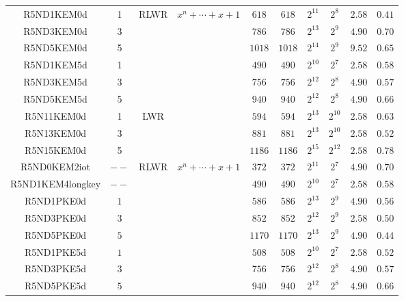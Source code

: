 \documentclass{cta-author}
\begin{document}
\begin{table}[pt]
\begin{tabular}{ c| c| c | c || c | c | c |c||c| c }
		
		R5ND1KEM0d&1&\multirow{6}{*}{RLWR}&\multirow{6}{*}{$x^{n}+\cdots +x+1$}&$618$&$618$&$2^{11}$&$2^8$& $2.58$&$0.41$\\
		R5ND3KEM0d&3&&& $786$&$786$&$2^{13}$&$2^9$& $4.90$&$0.70$\\
		R5ND5KEM0d&5&&& $1018$&$1018$&$2^{14}$&$2^9$& $9.52$&$0.65$\\
		
		
		R5ND1KEM5d&1&&& $490$&$490$&$2^{10}$&$2^7$& $2.58$&$0.58$\\
		
		R5ND3KEM5d&3&&& $756$&$756$&$2^{12}$&$2^8$& $4.90$&$0.57$\\
		
		R5ND5KEM5d&5&&& $940$&$940$&$2^{12}$&$2^8$& $4.90$&$0.66$\\
		\hline
	
		
		R5N11KEM0d&1&\multirow{3}{*}{LWR}&& $594$&$594$&$2^{13}$&$2^{10}$& $2.58$&$0.63$\\
		
		R5N13KEM0d&3&&& $881$&$881$&$2^{13}$&$2^{10}$& $2.58$&$0.52$\\
		
		R5N15KEM0d&5&&& $1186$&$1186$&$2^{15}$&$2^{12}$& $2.58$&$0.78$\\
		
		

		\hline
		R5ND0KEM2iot&$--$&\multirow{8}{*}{RLWR}&\multirow{8}{*}{$x^{n}+\cdots +x+1$}& $372$&$372$&$2^{11}$&$2^{7}$& $4.90$&$0.70$\\
		R5ND1KEM4longkey&$--$&&& $490$&$490$&$2^{10}$&$2^{7}$& $2.58$&$0.58$\\
		
		R5ND1PKE0d&$1$&&& $586$&$586$&$2^{13}$&$2^{9}$& $4.90$&$0.56$\\
		
	
		R5ND3PKE0d&$3$&&& $852$&$852$&$2^{12}$&$2^{9}$& $2.58$&$0.50$\\
		
		R5ND5PKE0d&$5$&&& $1170$&$1170$&$2^{13}$&$2^{9}$& $4.90$&$0.44$\\
		
		R5ND1PKE5d&$1$&&& $508$&$508$&$2^{10}$&$2^{7}$& $2.58$&$0.52$\\
		
		
		R5ND3PKE5d&$3$&&& $756$&$756$&$2^{12}$&$2^{8}$& $4.90$&$0.57$\\
		
		R5ND5PKE5d&$5$&&& $940$&$940$&$2^{12}$&$2^{8}$& $4.90$&$0.66$\\
		

\end{tabular}
\end{table}
\end{document}
